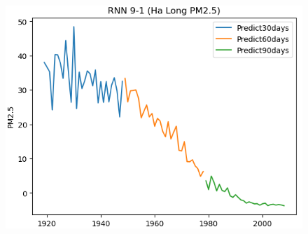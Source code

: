 \begin{figure}[H]
\begin{minipage}{0.15\textwidth}
    \includegraphics[width=1\textwidth]{img/final/RNN/90D/RNN_9_1_HL_90D.png}
    \end{minipage}
    \hfill


\end{figure}
